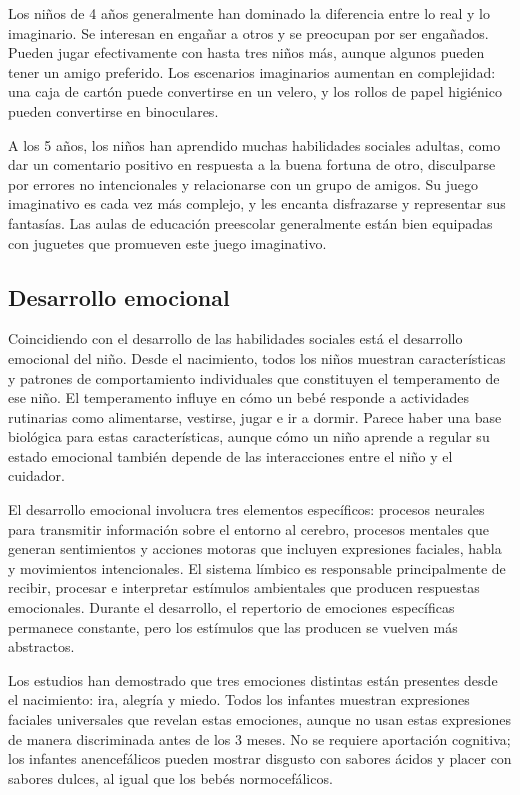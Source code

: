\documentclass[11pt,letterpaper]{report}
\begin{document}
Los niños de 4 años generalmente han dominado la diferencia entre lo real y lo
imaginario. Se interesan en engañar a otros y se preocupan por ser engañados.
Pueden jugar efectivamente con hasta tres niños más, aunque algunos pueden
tener un amigo preferido. Los escenarios imaginarios aumentan en complejidad:
una caja de cartón puede convertirse en un velero, y los rollos de papel
higiénico pueden convertirse en binoculares. \cite{Gerber2011}

A los 5 años, los niños han aprendido muchas habilidades sociales adultas, como
dar un comentario positivo en respuesta a la buena fortuna de otro, disculparse
por errores no intencionales y relacionarse con un grupo de amigos. Su juego
imaginativo es cada vez más complejo, y les encanta disfrazarse y representar
sus fantasías. Las aulas de educación preescolar generalmente están bien
equipadas con juguetes que promueven este juego imaginativo. \cite{Gerber2011}

\subsection{Desarrollo emocional}
Coincidiendo con el desarrollo de las habilidades sociales está el desarrollo
emocional del niño. Desde el nacimiento, todos los niños muestran
características y patrones de comportamiento individuales que constituyen el
temperamento de ese niño. El temperamento influye en cómo un bebé responde a
actividades rutinarias como alimentarse, vestirse, jugar e ir a dormir. Parece
haber una base biológica para estas características, aunque cómo un niño
aprende a regular su estado emocional también depende de las interacciones
entre el niño y el cuidador. \cite{Gerber2011}

El desarrollo emocional involucra tres elementos específicos: procesos neurales
para transmitir información sobre el entorno al cerebro, procesos mentales que
generan sentimientos y acciones motoras que incluyen expresiones faciales,
habla y movimientos intencionales. El sistema límbico es responsable
principalmente de recibir, procesar e interpretar estímulos ambientales que
producen respuestas emocionales. Durante el desarrollo, el repertorio de
emociones específicas permanece constante, pero los estímulos que las producen
se vuelven más abstractos. \cite{Gerber2011}

Los estudios han demostrado que tres emociones distintas están presentes desde
el nacimiento: ira, alegría y miedo. Todos los infantes muestran expresiones
faciales universales que revelan estas emociones, aunque no usan estas
expresiones de manera discriminada antes de los 3 meses. No se requiere
aportación cognitiva; los infantes anencefálicos pueden mostrar disgusto con
sabores ácidos y placer con sabores dulces, al igual que los bebés
normocefálicos. \cite{Gerber2011}
\end{document}
